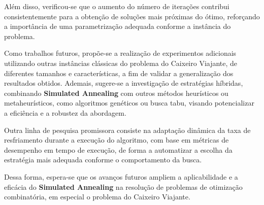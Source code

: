 \documentclass[12pt]{article}
\begin{document}
Além disso, verificou-se que o aumento do número de iterações contribui consistentemente para a obtenção de soluções mais próximas do ótimo, reforçando a importância de uma parametrização adequada conforme a instância do problema.

Como trabalhos futuros, propõe-se a realização de experimentos adicionais utilizando outras instâncias clássicas do problema do Caixeiro Viajante, de diferentes tamanhos e características, a fim de validar a generalização dos resultados obtidos. Ademais, sugere-se a investigação de estratégias híbridas, combinando \textbf{Simulated Annealing} com outros métodos heurísticos ou metaheurísticos, como algoritmos genéticos ou busca tabu, visando potencializar a eficiência e a robustez da abordagem.

Outra linha de pesquisa promissora consiste na adaptação dinâmica da taxa de resfriamento durante a execução do algoritmo, com base em métricas de desempenho em tempo de execução, de forma a automatizar a escolha da estratégia mais adequada conforme o comportamento da busca.

Dessa forma, espera-se que os avanços futuros ampliem a aplicabilidade e a eficácia do \textbf{Simulated Annealing} na resolução de problemas de otimização combinatória, em especial o problema do Caixeiro Viajante.




\end{document}
